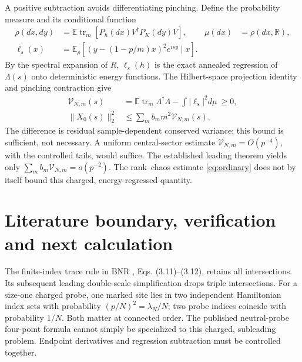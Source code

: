 \documentclass[11pt,a4paper]{article}
\newcommand{\EE}{\mathbb E}
\newcommand{\tr}{\operatorname{tr}}
\begin{document}
A positive subtraction avoids differentiating pinching. Define the
probability measure and its conditional function
\begin{align}
 \rho(dx,dy)&=\EE\tr_m[P_h(dx)V^\dagger P_K(dy)V],&
 \mu(dx)&=\rho(dx,\mathbb R),\\
 \ell_s(x)&=\EE_\rho[(y-(1-p/m)x)^2e^{isy}\mid x].
\end{align}
By the spectral expansion of $R$, $\ell_s(h)$ is the exact annealed
regression of $\Lambda(s)$ onto deterministic energy functions.
The Hilbert-space projection identity and pinching contraction give
\begin{align}
 \mathcal V_{N,m}(s)&=\EE\tr_m\Lambda^\dagger\Lambda
                  -\int|\ell_s|^2d\mu\ \ge0,\\
 \|X_0(s)\|_2^2&\le\sum_m b_m m^2\mathcal V_{N,m}(s).\label{eq:target}
\end{align}
The difference is residual sample-dependent conserved variance;
this bound is sufficient, not necessary. A uniform central-sector
estimate $\mathcal V_{N,m}=O(p^{-4})$, with the controlled tails,
would suffice. The established leading theorem yields only
$\sum_m b_m\mathcal V_{N,m}=o(p^{-2})$.
The rank--chaos estimate \eqref{eq:ordinary} does not by itself
bound this charged, energy-regressed quantity.

\newpage
\section{Literature boundary, verification and next calculation}
The finite-index trace rule in BNR \cite{BNR}, Eqs. (3.11)--(3.12),
retains all intersections. Its subsequent leading double-scale
simplification drops triple intersections. For a size-one charged
probe, one marked site lies in two independent Hamiltonian index
sets with probability $(p/N)^2=\lambda_N/N$; two probe indices
coincide with probability $1/N$. Both matter at connected order.
The published neutral-probe four-point formula cannot simply be
specialized to this charged, subleading problem. Endpoint
derivatives and regression subtraction must be controlled together.
\end{document}
